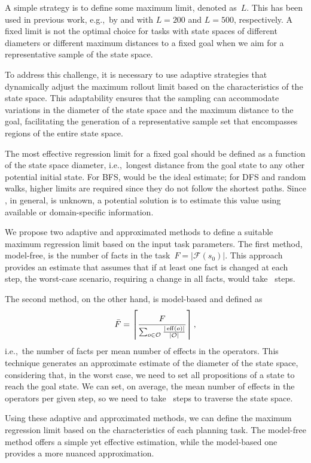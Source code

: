 A simple strategy is to define some maximum limit, denoted as~$L$. This has been used in previous work, e.g.,~by \citet{yu2020learning} and \citet{otoole2022sampling} with $L=200$ and $L=500$, respectively. A fixed limit is not the optimal choice for tasks with state spaces of different diameters or different maximum distances to a fixed goal when we aim for a representative sample of the state space.

To address this challenge, it is necessary to use adaptive strategies that dynamically adjust the maximum rollout limit based on the characteristics of the state space. This adaptability ensures that the sampling can accommodate variations in the diameter of the state space and the maximum distance to the goal, facilitating the generation of a representative sample set that encompasses regions of the entire state space.

The most effective regression limit for a fixed goal should be defined as a function of the state space diameter, i.e.,~longest distance \ssdiameter from the goal state to any other potential initial state. For BFS, \ssdiameter would be the ideal estimate; for DFS and random walks, higher limits are required since they do not follow the shortest paths. Since \ssdiameter, in general, is unknown, a potential solution is to estimate this value using available or domain-specific information.

We propose two adaptive and approximated methods to define a suitable maximum regression limit based on the input task parameters. The first method, model-free, is the number of facts in the task~$F=|\mathcal{F}(s_0)|$. This approach provides an estimate that assumes that if at least one fact is changed at each step, the worst-case scenario, requiring a change in all facts, would take \facts~steps.

The second method, on the other hand, is model-based and defined as~$$\bar F=\left\lceil \frac{F}{\sum_{o\in \mathcal{O}} \frac{|\operatorname{eff}(o)|}{|\mathcal{O}|}}\right\rceil,$$ i.e.,~the number of facts per mean number of effects in the operators. This technique generates an approximate estimate of the diameter of the state space, considering that, in the worst case, we need to set all propositions of a state to reach the goal state. We can set, on average, the mean number of effects in the operators per given step, so we need to take \meanfx~steps to traverse the state space.

Using these adaptive and approximated methods, we can define the maximum regression limit based on the characteristics of each planning task. The model-free method offers a simple yet effective estimation, while the model-based one provides a more nuanced approximation.

